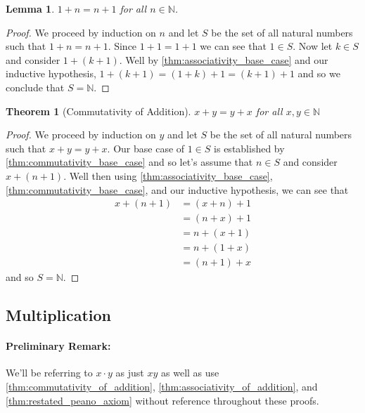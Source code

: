 \documentclass{article}
\theoremstyle{definition}
\theoremstyle{definition}
\theoremstyle{plain}
\theoremstyle{remark}
\theoremstyle{plain}
\newtheorem{theorem}{Theorem}[section]
\theoremstyle{remark}
\theoremstyle{plain}
\newtheorem{lemma}{Lemma}[section]
\theoremstyle{plain}
\theoremstyle{plain}
\theoremstyle{plain}
\begin{document}
\begin{lemma}
  \( 1 + n = n + 1 \) for all \( n \in \mathbb{N} \).
  \label{thm:commutativity_base_case}
\end{lemma}

\begin{proof}
  We proceed by induction on \( n \) and let \( S \) be the set of all natural 
  numbers such that \( 1 + n = n + 1 \). Since \( 1 + 1 = 1 + 1 \) we can see 
  that \( 1 \in S \). Now let \( k \in S \) and consider \( 1 + (k + 1)\). Well
  by \autoref{thm:associativity_base_case} and our inductive hypothesis, 
  \( 1 + (k + 1) = (1 + k) + 1 = (k + 1) + 1 \) and so we conclude that 
  \( S = \mathbb{N} \).  
\end{proof}

\begin{theorem}[Commutativity of Addition]
  \( x + y = y + x \) for all \( x, y \in \mathbb{N} \) 
  \label{thm:commutativity_of_addition}
\end{theorem}

\begin{proof}
  We proceed by induction on \( y \) and let \( S \) be the set of all natural 
  numbers such that \( x + y = y + x \). Our base case of \( 1 \in S \) is 
  established by \autoref{thm:commutativity_base_case} and so let's assume that 
  \( n \in S \) and consider \( x + (n + 1) \). Well then using 
  \autoref{thm:associativity_base_case}, \autoref{thm:commutativity_base_case}, 
  and our inductive hypothesis, we can see that 
  \begin{align*}
    x + (n + 1) &= (x + n) + 1 \\
                &= (n + x) + 1 \\ 
                &= n + (x + 1) \\
                &= n + (1 + x) \\
                &= (n + 1) + x
  \end{align*}
  and so \( S = \mathbb{N} \).
\end{proof}

\newpage

\subsection{Multiplication}

\paragraph{Preliminary Remark:}
We'll be referring to \( x \cdot y \) as just \( xy \) as well as use 
\autoref{thm:commutativity_of_addition}, 
\autoref{thm:associativity_of_addition}, and \autoref{thm:restated_peano_axiom} 
without reference throughout these proofs.
\end{document}

